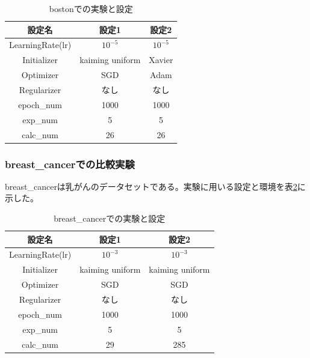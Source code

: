 \begin{table}[htbp]
    \begin{center}
        \caption{bostonでの実験と設定}
        \label{exp:boston}
        \vspace{2mm} 
        \begin{tabular}{ |c|c|c| }
        設定名 & 設定1 & 設定2 \\
        \hline
        LearningRate(lr)         & $ 10^{-5} $ & $ 10^{-5} $ \\
        Initializer       & kaiming uniform  & Xavier \\
        Optimizer           & SGD & Adam \\
        Regularizer     & なし & なし \\
        epoch\_num       & 1000 &  1000 \\
        exp\_num         & 5 & 5 \\
        calc\_num        & 26 & 26 \\
        \end{tabular}
    \end{center}
\end{table}


\subsubsection{breast\_cancerでの比較実験}
\label{impl:breastcancer}

breast\_cancerは乳がんのデータセットである。実験に用いる設定と環境を表\ref{exp:breastcancer}に示した。

\begin{table}[htbp]
    \begin{center}
        \caption{breast\_cancerでの実験と設定}
        \label{exp:breastcancer}
        \vspace{2mm} 
        \begin{tabular}{ |c|c|c| }
        設定名 & 設定1 & 設定2 \\
        \hline
        LearningRate(lr)         & $ 10^{-3} $ & $ 10^{-3} $ \\
        Initializer       & kaiming uniform & kaiming uniform \\
        Optimizer           & SGD & SGD \\
        Regularizer     & なし & なし \\
        epoch\_num       & 1000 &  1000 \\
        exp\_num         & 5 & 5 \\
        calc\_num        & 29 & 285 \\
        \end{tabular}
    \end{center}
\end{table}


